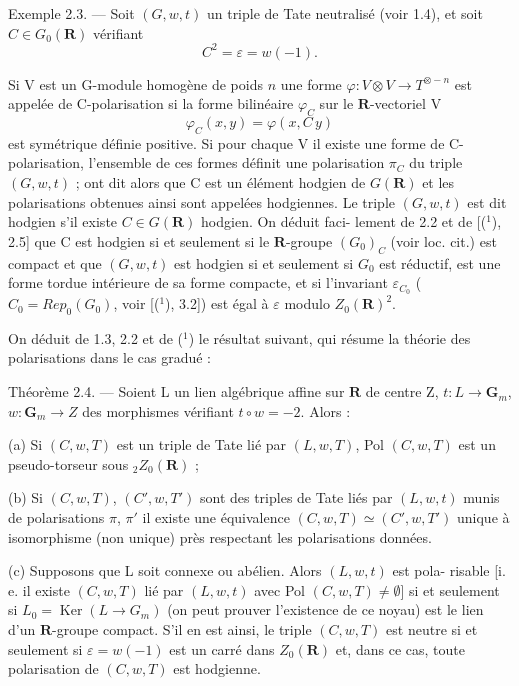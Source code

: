 
Exemple 2.3. --- Soit $(G, w, t)$ un triple de Tate neutralisé (voir 1.4),
et soit $C \in G_0(\mathbf{R})$ vérifiant
\[ C^2 = \varepsilon = w(-1). \]

Si V est un G-module homogène de poids $n$ une forme $\varphi : V \otimes V \to T^{\otimes -n}$
est appelée de C-polarisation si la forme bilinéaire $\varphi_C$ sur le $\mathbf{R}$-vectoriel V
\[ \varphi_C(x, y) = \varphi(x, C\,y) \]
est symétrique définie positive. Si pour chaque V il existe une forme
de C-polarisation, l'ensemble de ces formes définit une polarisation $\pi_C$
du triple $(G, w, t)$ ; ont dit alors que C est un élément hodgien de $G(\mathbf{R})$
et les polarisations obtenues ainsi sont appelées hodgiennes. Le triple
$(G, w, t)$ est dit hodgien s'il existe $C \in G(\mathbf{R})$ hodgien. On déduit faci-%
lement de 2.2 et de [(${}^1$), 2.5] que C est hodgien si et seulement si le
$\mathbf{R}$-groupe $(G_0)_C$ (voir loc. cit.) est compact et que $(G, w, t)$ est hodgien
si et seulement si $G_0$ est réductif, est une forme tordue intérieure de sa
forme compacte, et si l'invariant $\varepsilon_{C_0}$ ($C_0 = Rep_0(G_0)$, voir [(${}^1$), 3.2])
est égal à $\varepsilon$ modulo $Z_0(\mathbf{R})^2$.

On déduit de 1.3, 2.2 et de (${}^1$) le résultat suivant, qui résume la
théorie des polarisations dans le cas gradué :

Théorème 2.4. --- Soient L un lien algébrique affine sur $\mathbf{R}$ de centre Z,
$t : L \to \mathbf{G}_m$, $w : \mathbf{G}_m \to Z$ des morphismes vérifiant $t \circ w = -2$. Alors :

(a) Si $(C, w, T)$ est un triple de Tate lié par $(L, w, T)$, Pol $(C, w, T)$
est un pseudo-torseur sous ${}_2Z_0(\mathbf{R})$ ;

(b) Si $(C, w, T)$, $(C', w, T')$ sont des triples de Tate liés par $(L, w, t)$
munis de polarisations $\pi$, $\pi'$ il existe une équivalence $(C, w, T) \simeq (C', w, T')$
unique à isomorphisme (non unique) près respectant les polarisations données.

(c) Supposons que L soit connexe ou abélien. Alors $(L, w, t)$ est pola-%
risable [i. e. il existe $(C, w, T)$ lié par $(L, w, t)$ avec Pol $(C, w, T) \neq \emptyset$]
si et seulement si $L_0 = \operatorname{Ker}(L \to G_m)$ (on peut prouver l'existence de
ce noyau) est le lien d'un $\mathbf{R}$-groupe compact. S'il en est ainsi, le triple
$(C, w, T)$ est neutre si et seulement si $\varepsilon = w(-1)$ est un carré dans $Z_0(\mathbf{R})$
et, dans ce cas, toute polarisation de $(C, w, T)$ est hodgienne.

